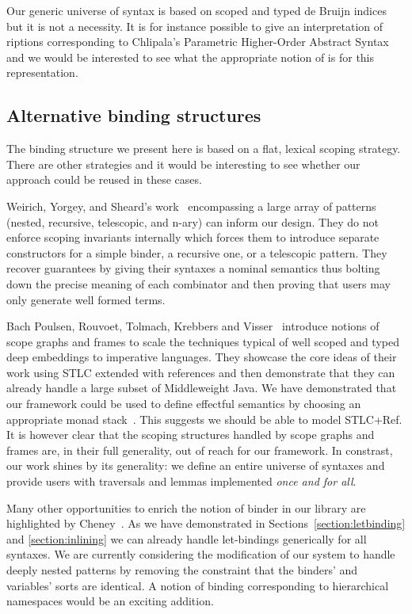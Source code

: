Our generic universe of syntax is based on
scoped and typed de Bruijn indices~\cite{de1972lambda} but it is not
a necessity. It is for instance possible to give an interpretation
of riptions corresponding to Chlipala's Parametric Higher-Order
Abstract Syntax~\citeyear{DBLP:conf/icfp/Chlipala08} and we would be interested
to see what the appropriate notion of  is for this representation.

\subsection{Alternative binding structures} The binding structure we
present here is based on a flat, lexical scoping strategy. There are
other strategies and it would be interesting to see whether
our approach could be reused in these cases.

Weirich, Yorgey, and Sheard's work~\citeyear{DBLP:conf/icfp/WeirichYS11}
encompassing a large array of patterns (nested, recursive, telescopic, and
n-ary) can inform our design. They do not enforce scoping invariants internally
which forces them to introduce separate constructors for a simple binder, a
recursive one, or a telescopic pattern. They recover guarantees by giving
their syntaxes a nominal semantics thus bolting down the precise meaning of
each combinator and then proving that users may only generate well formed
terms.

Bach Poulsen, Rouvoet, Tolmach, Krebbers and Visser~\citeyear{BachPoulsen}
introduce notions of scope graphs and frames to scale the techniques typical
of well scoped and typed deep embeddings to imperative languages.
They showcase the core ideas of their work using STLC extended with references
and then demonstrate that they can already handle a large subset of Middleweight
Java.
We have demonstrated that our framework could be used to define effectful
semantics by choosing an appropriate monad stack~\cite{DBLP:journals/iandc/Moggi91}.
This suggests we should be able to model STLC+Ref. It is however clear that
the scoping structures handled by scope graphs and frames are, in their full
generality, out of reach for our framework. In constrast, our work shines by
its generality: we define an entire universe of syntaxes and provide users
with traversals and lemmas implemented \emph{once and for all}.

Many other opportunities to enrich the notion of binder in our library are
highlighted by Cheney~\citeyear{DBLP:conf/icfp/Cheney05a}. As we have demonstrated
in Sections~\ref{section:letbinding} and \ref{section:inlining} we can already
handle let-bindings generically for all syntaxes. We are currently considering
the modification of our system to handle deeply nested patterns by removing the
constraint that the binders' and variables' sorts are identical. A notion of
binding corresponding to hierarchical namespaces would be an exciting addition.

